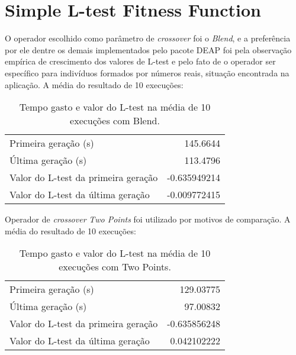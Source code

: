 \section{Simple L-test Fitness Function}
O operador escolhido como parâmetro de {\it crossover} foi o {\it Blend}, e a preferência por ele dentre os demais implementados pelo pacote DEAP foi pela observação empírica de crescimento dos valores de L-test e pelo fato de o operador ser específico para indivíduos formados por números reais, situação encontrada na aplicação. A média do resultado de 10 execuções:  \\

\begin{table}[!h]
  \begin{center}
  \begin{tabular}{|l|r|}
    \hline
    Primeira geração (s) & 145.6644\\
    Última geração (s) & 113.4796\\
    Valor do L-test da primeira geração & -0.635949214\\
    Valor do L-test da última geração & -0.009772415\\
    \hline    
  \end{tabular}
  \end{center}
  \caption{Tempo gasto e valor do L-test na média de 10 execuções com Blend.}
  \label{GAParameters--}
\end{table}

Operador de {\it crossover} {\it Two Points} foi utilizado por motivos de comparação. A média do resultado de 10 execuções: \\
\begin{table}[!h]
  \begin{center}
  \begin{tabular}{|l|r|}
    \hline
    Primeira geração (s) & 129.03775\\
    Última geração (s) & 97.00832\\
    Valor do L-test da primeira geração & -0.635856248\\
    Valor do L-test da última geração & 0.042102222\\
    \hline    
  \end{tabular}
  \end{center}
  \caption{Tempo gasto e valor do L-test na média de 10 execuções com Two Points.}
  \label{GAParameters---}
\end{table}

